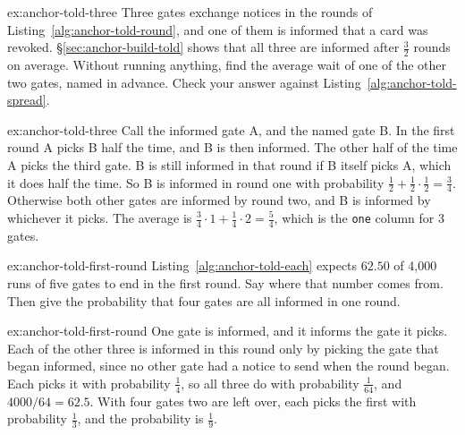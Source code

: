 \documentclass[11pt,a4paper]{article}
\theoremstyle{definition}
\begin{document}
\begin{pdexercise}[kind=Check,rating=1]{ex:anchor-told-three}
Three gates exchange notices in the rounds of Listing~\ref{alg:anchor-told-round}, and one of them is informed that a card was revoked. \S\ref{sec:anchor-build-told} shows that all three are informed after $\tfrac32$ rounds on average. Without running anything, find the average wait of one of the other two gates, named in advance. Check your answer against Listing~\ref{alg:anchor-told-spread}.
\end{pdexercise}
\begin{pdsolution}{ex:anchor-told-three}
Call the informed gate A, and the named gate B. In the first round A picks B half the time, and B is then informed. The other half of the time A picks the third gate. B is still informed in that round if B itself picks A, which it does half the time. So B is informed in round one with probability $\tfrac12+\tfrac12\cdot\tfrac12=\tfrac34$. Otherwise both other gates are informed by round two, and B is informed by whichever it picks. The average is $\tfrac34\cdot1+\tfrac14\cdot2=\tfrac54$, which is the \texttt{one} column for 3 gates.
\end{pdsolution}

\begin{pdexercise}[kind=Trace,rating=2]{ex:anchor-told-first-round}
Listing~\ref{alg:anchor-told-each} expects $62.50$ of 4{,}000 runs of five gates to end in the first round. Say where that number comes from. Then give the probability that four gates are all informed in one round.
\end{pdexercise}
\begin{pdsolution}{ex:anchor-told-first-round}
One gate is informed, and it informs the gate it picks. Each of the other three is informed in this round only by picking the gate that began informed, since no other gate had a notice to send when the round began. Each picks it with probability $\tfrac14$, so all three do with probability $\tfrac1{64}$, and $4000/64=62.5$. With four gates two are left over, each picks the first with probability $\tfrac13$, and the probability is $\tfrac19$.
\end{pdsolution}
\end{document}
